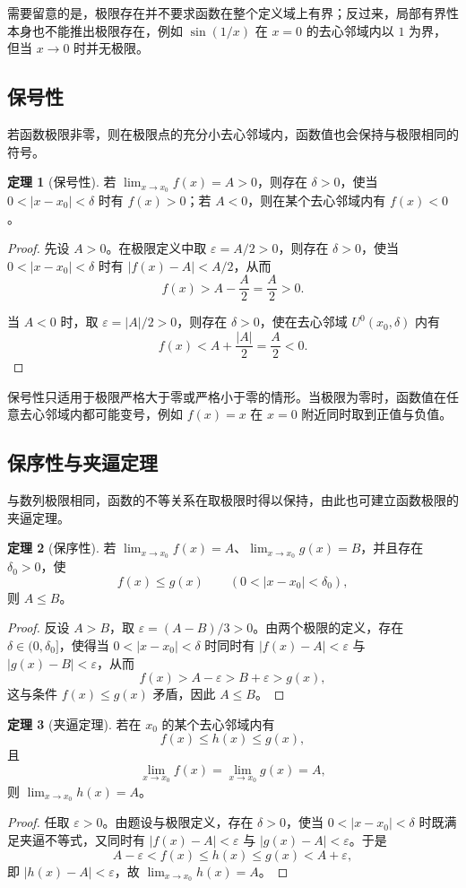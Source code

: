 \documentclass[UTF8,fontset=fandol,a4paper,12pt]{ctexart}
\newcommand{\U}{U}
\theoremstyle{definition}
\newtheorem{theorem}{定理}
\begin{document}
需要留意的是，极限存在并不要求函数在整个定义域上有界；反过来，局部有界性本身也不能推出极限存在，例如 $\sin(1/x)$ 在 $x=0$ 的去心邻域内以 $1$ 为界，但当 $x\to0$ 时并无极限。

\subsection*{保号性}
若函数极限非零，则在极限点的充分小去心邻域内，函数值也会保持与极限相同的符号。

\begin{theorem}[保号性]
若 $\lim_{x\to x_0}f(x)=A>0$，则存在 $\delta>0$，使当 $0<|x-x_0|<\delta$ 时有 $f(x)>0$；若 $A<0$，则在某个去心邻域内有 $f(x)<0$。
\end{theorem}
\begin{proof}
先设 $A>0$。在极限定义中取 $\varepsilon=A/2>0$，则存在 $\delta>0$，使当 $0<|x-x_0|<\delta$ 时有 $|f(x)-A|<A/2$，从而
\[
 f(x)>A-\frac A2=\frac A2>0.
\]

当 $A<0$ 时，取 $\varepsilon=|A|/2>0$，则存在 $\delta>0$，使在去心邻域 $\U^0(x_0,\delta)$ 内有
\[
 f(x)<A+\frac{|A|}{2}=\frac A2<0.
\]
\end{proof}

保号性只适用于极限严格大于零或严格小于零的情形。当极限为零时，函数值在任意去心邻域内都可能变号，例如 $f(x)=x$ 在 $x=0$ 附近同时取到正值与负值。

\subsection*{保序性与夹逼定理}
与数列极限相同，函数的不等关系在取极限时得以保持，由此也可建立函数极限的夹逼定理。

\begin{theorem}[保序性]
若 $\lim_{x\to x_0}f(x)=A$、$\lim_{x\to x_0}g(x)=B$，并且存在 $\delta_0>0$，使
\[
 f(x)\le g(x)\qquad(0<|x-x_0|<\delta_0),
\]
则 $A\le B$。
\end{theorem}
\begin{proof}
反设 $A>B$，取 $\varepsilon=(A-B)/3>0$。由两个极限的定义，存在 $\delta\in(0,\delta_0]$，使得当 $0<|x-x_0|<\delta$ 时同时有 $|f(x)-A|<\varepsilon$ 与 $|g(x)-B|<\varepsilon$，从而
\[
 f(x)>A-\varepsilon>B+\varepsilon>g(x),
\]
这与条件 $f(x)\le g(x)$ 矛盾，因此 $A\le B$。
\end{proof}

\begin{theorem}[夹逼定理]
若在 $x_0$ 的某个去心邻域内有
\[
 f(x)\le h(x)\le g(x),
\]
且
\[
 \lim_{x\to x_0}f(x)=\lim_{x\to x_0}g(x)=A,
\]
则 $\lim_{x\to x_0}h(x)=A$。
\end{theorem}
\begin{proof}
任取 $\varepsilon>0$。由题设与极限定义，存在 $\delta>0$，使当 $0<|x-x_0|<\delta$ 时既满足夹逼不等式，又同时有 $|f(x)-A|<\varepsilon$ 与 $|g(x)-A|<\varepsilon$。于是
\[
 A-\varepsilon<f(x)\le h(x)\le g(x)<A+\varepsilon,
\]
即 $|h(x)-A|<\varepsilon$，故 $\lim_{x\to x_0}h(x)=A$。
\end{proof}
\end{document}
